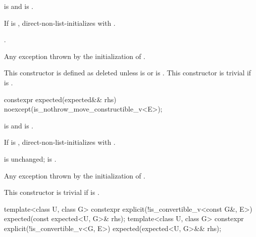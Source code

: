 \begin{itemdescr}
\pnum
\constraints
{} is  and  is .

\pnum
\effects
If  is , direct-non-list-initializes  with .

\pnum
\ensures
{}.

\pnum
\throws
Any exception thrown by the initialization of .

\pnum
\remarks
This constructor is defined as deleted unless  is  or  is . This constructor is trivial if  is .
\end{itemdescr}

%
\begin{itemdecl}
constexpr expected(expected&& rhs) noexcept(is_nothrow_move_constructible_v<E>);
\end{itemdecl}

\begin{itemdescr}
\pnum
\constraints
{} is  and  is .

\pnum
\effects
If  is , direct-non-list-initializes  with .

\pnum
\ensures
{} is unchanged;  is .

\pnum
\throws
Any exception thrown by the initialization of .

\pnum
\remarks
This constructor is trivial if  is .
\end{itemdescr}

%
\begin{itemdecl}
template<class U, class G>
constexpr explicit(!is_convertible_v<const G&, E>) expected(const expected<U, G>& rhs);
template<class U, class G>
constexpr explicit(!is_convertible_v<G, E>) expected(expected<U, G>&& rhs);
\end{itemdecl}

